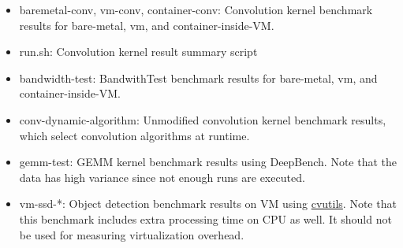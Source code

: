 \begin{itemize}
\tightlist
\item
  baremetal-conv, vm-conv, container-conv: Convolution kernel benchmark
  results for bare-metal, vm, and container-inside-VM.
\item
  run.sh: Convolution kernel result summary script
\item
  bandwidth-test: BandwithTest benchmark results for bare-metal, vm, and
  container-inside-VM.
\item
  conv-dynamic-algorithm: Unmodified convolution kernel benchmark
  results, which select convolution algorithms at runtime.
\item
  gemm-test: GEMM kernel benchmark results using DeepBench. Note that
  the data has high variance since not enough runs are executed.
\item
  vm-ssd-*: Object detection benchmark results on VM using
  \href{www.github.com/junjuew/cvutils}{cvutils}. Note that this
  benchmark includes extra processing time on CPU as well. It should not
  be used for measuring virtualization overhead.
\end{itemize}
